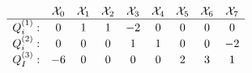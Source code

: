 \begin{equation}
\label{eq:3C*'s}
\begin{array}{ccccccccc}\\ 
& {\cal X}_0 &{\cal X}_1 & {\cal  X}_2 & {\cal  X}_3 & {\cal X}_4 & {\cal X}_5 
& {\cal X}_6 & {\cal X}_7\\ \hline
Q^{(1)}_i:& 0 & 1 & 1 & -2
& 0 & 0 & 0 & 0 \\
Q^{(2)}_i:& 0 & 0 & 0 & 1 & 1 & 0 & 0 & -2 \\
Q^{(3)}_I: & -6 & 0 & 0 & 0 & 0 & 2 & 3 & 1 \\
\end{array}
\end{equation}

